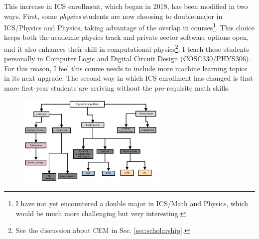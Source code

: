 \documentclass[../../main.tex]{subfiles}
\begin{document}
This increase in ICS enrollment, which began in 2018, has been modified in two ways.  First, some \textit{physics} students are now choosing to double-major in ICS/Physics and Physics, taking advantage of the overlap in courses\footnote{I have not yet encountered a double major in ICS/Math and Physics, which would be much more challenging but very interesting.}.  This choice keeps both the academic physics track and private sector software options open, and it also enhances their skill in computational physics\footnote{See the discussion about CEM in Sec. \ref{sec:scholarship}.}.  I teach these students personally in Computer Logic and Digital Circuit Design (COSC330/PHYS306).  For this reason, I feel this course needs to include more machine learning topics in its next upgrade.  The second way in which ICS enrollment has changed is that more first-year students are arriving without the pre-requisite math skills.

\begin{figure}[hb]
\centering
\includegraphics[width=0.65\textwidth]{figures/tree.pdf}
\caption{\label{fig:tree}}
\end{figure}
\end{document}
